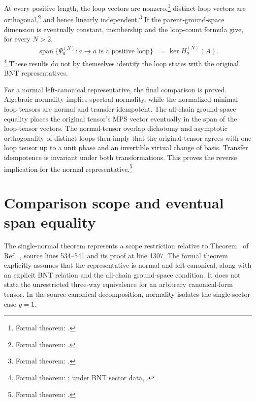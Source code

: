 \documentclass{article}
\begin{document}
At every positive length, the loop vectors are nonzero,\footnote{Formal
theorem: .}
distinct loop vectors are orthogonal,\footnote{Formal theorem:
.}
and hence linearly independent.\footnote{Formal theorem:
.}
If the parent-ground-space dimension is eventually constant, membership and
the loop-count formula give, for every $N>2$,
\begin{align}
    \operatorname{span}
    \{\Psi_a^{(N)}:a\to a\text{ is a positive loop}\}
        &=
        \ker H_2^{(N)}(A).
    \label{eq:cpsv16_nncph_ground_state_scope_loop_ground_space_spanning}
\end{align}
\footnote{Formal theorem:
;
under BNT sector data,
.}
These results do not by themselves identify the loop states with the original
BNT representatives.

For a normal left-canonical representative, the final comparison is proved.
Algebraic normality implies spectral normality, while the normalized minimal
loop tensors are normal and transfer-idempotent. The all-chain ground-space
equality places the original tensor's MPS vector eventually in the span of the
loop-tensor vectors. The normal-tensor overlap dichotomy and asymptotic
orthogonality of distinct loops then imply that the original tensor agrees
with one loop tensor up to a unit phase and an invertible virtual change of
basis. Transfer idempotence is invariant under both transformations. This
proves the reverse implication for the normal representative.\footnote{Formal
theorem: .}

\section{Comparison scope and eventual span equality}

The single-normal theorem represents a scope restriction relative to
Theorem~ of Ref.~\cite{Cirac2016MPDO_arXiv}, source lines
534--541 and its proof at line 1307. The formal theorem explicitly assumes that
the representative is normal and left-canonical, along with an explicit BNT
relation and the all-chain ground-space condition. It does not state the
unrestricted three-way equivalence for an arbitrary canonical-form tensor. In
the source canonical decomposition, normality isolates the single-sector case
$g=1$.
\end{document}
